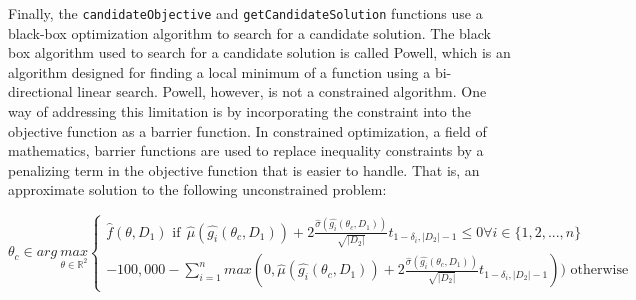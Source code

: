 \documentclass[12pt, twoside]{amherstthesis}
\begin{document}
\noindent Finally, the \texttt{candidateObjective} and \texttt{getCandidateSolution} functions use a black-box optimization algorithm to search for a candidate solution. The black box algorithm used to search for a candidate solution is called Powell, which is an algorithm designed for finding a local minimum of a function using a bi-directional linear search. Powell, however, is not a constrained algorithm. One way of addressing this limitation is by incorporating the constraint into the objective function as a barrier function. In constrained optimization, a field of mathematics, barrier functions are used to replace inequality constraints by a penalizing term in the objective function that is easier to handle. That is, an approximate solution to the following unconstrained problem:

\[
\theta_c \in arg \: \underset{\theta \in \mathbb{R}^2}{max} 
    \begin{cases} 
      \hat{f}(\theta, D_1)  \text{    if} \:\: \hat{\mu}(\hat{g_i}(\theta_c, D_1)) + 2 \frac{\hat{\sigma}(\hat{g_i}(\theta_c, D_1))}{\sqrt{|D_2|}} t_{1-\delta_i, |D_2|-1} \leq 0 \forall i \in \{1,2,...,n\}\\
      -100,000 - \sum_{i=1}^n max(0, \hat{\mu}(\hat{g_i}(\theta_c, D_1)) + 2 \frac{\hat{\sigma}(\hat{g_i}(\theta_c, D_1))}{\sqrt{|D_2|}} t_{1-\delta_i, |D_2|-1})) \text{  otherwise}
    \end{cases}
\]
\end{document}
